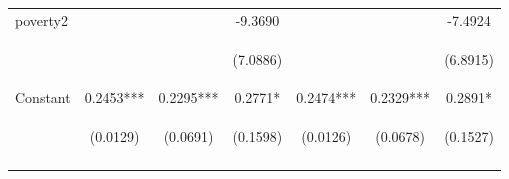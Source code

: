 \begin{center}
\begin{tabular}{lcccccc}
poverty2 &  &  & -9.3690 &  &  & -7.4924 \\
\vspace{4pt} & \begin{footnotesize}\end{footnotesize} & \begin{footnotesize}\end{footnotesize} & \begin{footnotesize}(7.0886)\end{footnotesize} & \begin{footnotesize}\end{footnotesize} & \begin{footnotesize}\end{footnotesize} & \begin{footnotesize}(6.8915)\end{footnotesize} \\
Constant & 0.2453*** & 0.2295*** & 0.2771* & 0.2474*** & 0.2329*** & 0.2891* \\
 & \begin{footnotesize}(0.0129)\end{footnotesize} & \begin{footnotesize}(0.0691)\end{footnotesize} & \begin{footnotesize}(0.1598)\end{footnotesize} & \begin{footnotesize}(0.0126)\end{footnotesize} & \begin{footnotesize}(0.0678)\end{footnotesize} & \begin{footnotesize}(0.1527)\end{footnotesize} \\
\vspace{4pt} & \begin{footnotesize}\end{footnotesize} & \begin{footnotesize}\end{footnotesize} & \begin{footnotesize}\end{footnotesize} & \begin{footnotesize}\end{footnotesize} & \begin{footnotesize}\end{footnotesize} & \begin{footnotesize}\end{footnotesize} \\

\end{tabular}
\end{center}
